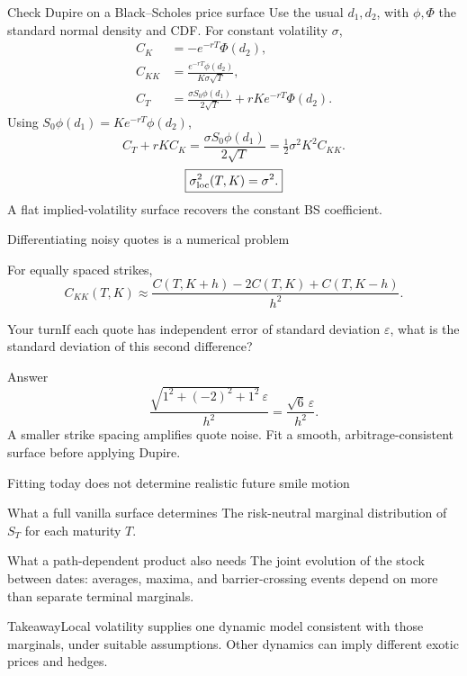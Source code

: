 \documentclass[handout,10pt,t,aspectratio=169]{beamer}
\newenvironment{pausebox}{\begin{block}{Your turn}}{\end{block}}
\newenvironment{answerbox}{\begin{exampleblock}{Answer}}{\end{exampleblock}}
\newenvironment{keybox}{\begin{exampleblock}{Takeaway}}{\end{exampleblock}}
\begin{document}
\begin{frame}{Check Dupire on a Black--Scholes price surface}
\small
Use the usual \(d_1,d_2\), with \(\phi,\Phi\) the standard normal density and CDF.
For constant volatility \(\sigma\),
\[
\begin{aligned}
C_K&=-e^{-rT}\Phi(d_2),\\
C_{KK}&=\frac{e^{-rT}\phi(d_2)}{K\sigma\sqrt T},\\
C_T&=\frac{\sigma S_0\phi(d_1)}{2\sqrt T}+rKe^{-rT}\Phi(d_2).
\end{aligned}
\]
Using \(S_0\phi(d_1)=Ke^{-rT}\phi(d_2)\),
\[
C_T+rKC_K=\frac{\sigma S_0\phi(d_1)}{2\sqrt T}
=\tfrac12\sigma^2K^2C_{KK}.
\]
\[
\boxed{\sigma_{\rm loc}^2(T,K)=\sigma^2.}
\]
A flat implied-volatility surface recovers the constant BS coefficient.
\end{frame}



\begin{frame}{Differentiating noisy quotes is a numerical problem}

    For equally spaced strikes,
    \[C_{KK}(T,K)\approx
      \frac{C(T,K+h)-2C(T,K)+C(T,K-h)}{h^2}.\]
    \begin{pausebox}If each quote has independent error of standard deviation
    \(\varepsilon\), what is the standard deviation of this second difference?\end{pausebox}
    \begin{answerbox}
    \[\frac{\sqrt{1^2+(-2)^2+1^2}\,\varepsilon}{h^2}
      =\frac{\sqrt6\,\varepsilon}{h^2}.\]
    A smaller strike spacing amplifies quote noise. Fit a smooth,
    arbitrage-consistent surface before applying Dupire.
    \end{answerbox}
\end{frame}

\begin{frame}{Fitting today does not determine realistic future smile motion}

    \begin{block}{What a full vanilla surface determines}
    The risk-neutral marginal distribution of \(S_T\) for each maturity \(T\).
    \end{block}
    \begin{block}{What a path-dependent product also needs}
    The joint evolution of the stock between dates: averages, maxima, and
    barrier-crossing events depend on more than separate terminal marginals.
    \end{block}
    \begin{keybox}Local volatility supplies one dynamic model consistent with
    those marginals, under suitable assumptions. Other dynamics can imply
    different exotic prices and hedges.\end{keybox}
\end{frame}
\end{document}
